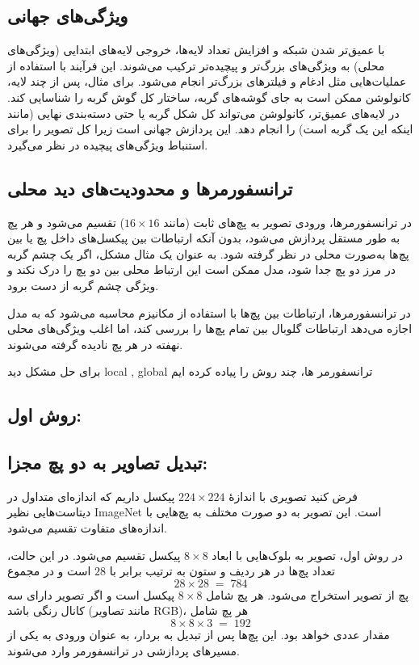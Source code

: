 \subsection{ویژگی‌های جهانی}
با عمیق‌تر شدن شبکه و افزایش تعداد لایه‌ها، خروجی لایه‌های ابتدایی (ویژگی‌های محلی) به ویژگی‌های بزرگ‌تر و پیچیده‌تر ترکیب می‌شوند. این فرآیند با استفاده از عملیات‌هایی مثل ادغام و فیلترهای بزرگ‌تر انجام می‌شود. برای مثال، پس از چند لایه، کانولوشن ممکن است به جای گوشه‌های گربه، ساختار کل گوش گربه را شناسایی کند. در لایه‌های عمیق‌تر، کانولوشن می‌تواند کل شکل گربه یا حتی دسته‌بندی نهایی (مانند اینکه این یک گربه است) را انجام دهد. این پردازش جهانی است زیرا کل تصویر را برای استنباط ویژگی‌های پیچیده در نظر می‌گیرد.

\subsection{ترانسفورمرها و محدودیت‌های دید محلی}
در ترانسفورمرها، ورودی تصویر به پچ‌های ثابت (مانند $16 \times 16$) تقسیم می‌شود و هر پچ به طور مستقل پردازش می‌شود، بدون آنکه ارتباطات بین پیکسل‌های داخل پچ یا بین پچ‌ها به‌صورت محلی در نظر گرفته شود. به عنوان یک مثال مشکل، اگر یک چشم گربه در مرز دو پچ جدا شود، مدل ممکن است این ارتباط محلی بین دو پچ را درک نکند و ویژگی چشم گربه از دست برود. 

در ترانسفورمرها، ارتباطات بین پچ‌ها با استفاده از مکانیزم  محاسبه می‌شود که به مدل اجازه می‌دهد ارتباطات گلوبال بین تمام پچ‌ها را بررسی کند، اما اغلب ویژگی‌های محلی نهفته در هر پچ نادیده گرفته می‌شوند.

برای حل مشکل دید local , global  ترانسفورمر ها، چند روش را پیاده کرده ایم 

\subsection{روش اول:}

\subsection{تبدیل تصاویر به دو پچ مجزا:}

فرض کنید تصویری با اندازهٔ $224 \times 224$ پیکسل داریم که اندازه‌ای متداول در دیتاست‌هایی نظیر ImageNet است. این تصویر به دو صورت مختلف به پچ‌هایی با اندازه‌های متفاوت تقسیم می‌شود. 

در روش اول، تصویر به بلوک‌هایی با ابعاد $8 \times 8$ پیکسل تقسیم می‌شود. در این حالت، تعداد پچ‌ها در هر ردیف و ستون به ترتیب برابر با  $28$ است و در مجموع 
\[
28 \times 28 \;=\; 784
\]
پچ از تصویر استخراج می‌شود. هر پچ شامل $8 \times 8$ پیکسل است و اگر تصویر دارای سه کانال رنگی باشد (مانند تصاویر RGB)، هر پچ شامل 
\[
8 \times 8 \times 3 \;=\; 192
\]
مقدار عددی خواهد بود. این پچ‌ها پس از تبدیل به بردار، به عنوان ورودی به یکی از مسیرهای پردازشی در ترانسفورمر وارد می‌شوند.

